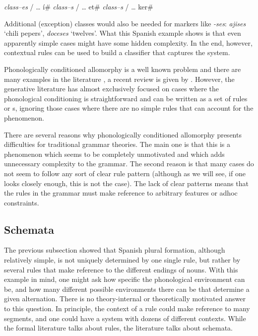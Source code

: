 \begin{exe}
    \ex \begin{xlist}
        \ex \textit{class--es} / \dots{} í\#
        \ex \textit{class--s} / \dots{} et\#
        \ex \textit{class--s} / \dots{} ker\#
    \end{xlist}
\end{exe}

Additional (exception) classes would also be needed for markers like \textit{-ses}: \textit{aji\emph{ses}} `chili pepers', \textit{doce\emph{ses}} `twelves'. What this Spanish example shows is that even apparently simple cases might have some hidden complexity. In the end, however, contextual rules can be used to build a classifier that captures the system.

Phonologically conditioned allomorphy is a well known problem and there are many examples in the literature \autocites{Alber.2009, Anderson.2008, Baptista.2006, Booij.1998, Carstairs.1998, Malkiel.1988, Rubach.2001}, a recent review is given by \textcite{Nevins.2011a}. However, the generative literature has almost exclusively focused on cases where the phonological conditioning is straightforward and can be written as a set of rules or s, ignoring those cases where there are no simple rules that can account for the phenomenon.

There are several reasons why phonologically conditioned allomorphy presents difficulties for traditional grammar theories. The main one is that this is a phenomenon which seems to be completely unmotivated and which adds unnecessary complexity to the grammar. The second reason is that many cases do not seem to follow any sort of clear rule pattern (although as we will see, if one looks closely enough, this is not the case). The lack of clear patterns means that the rules in the grammar must make reference to arbitrary features or adhoc constraints.


\subsection{Schemata}


The previous subsection showed that Spanish plural formation, although relatively simple, is not uniquely determined by one single rule, but rather by several rules that make reference to the different endings of nouns. With this example in mind, one might ask how specific the phonological environment can be, and how many different possible environments there can be that determine a given alternation. There is no theory-internal or theoretically motivated answer to this question. In principle, the context of a rule could make reference to many segments, and one could have a system with dozens of different contexts. While the formal literature talks about rules, the  literature talks about schemata.

